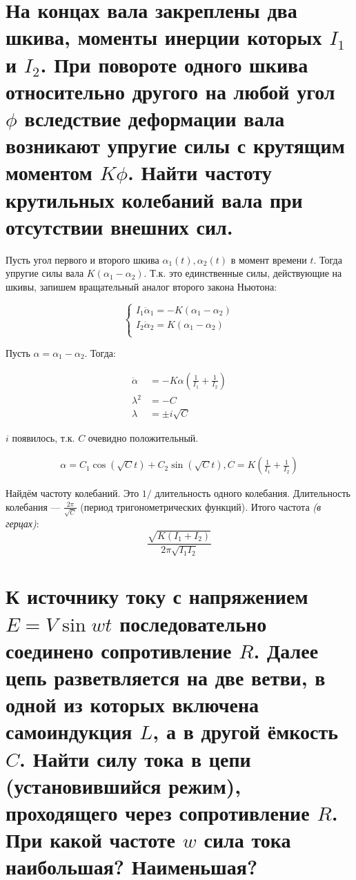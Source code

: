 \section{На концах вала закреплены два шкива, моменты инерции которых \(I_1\) и \(I_2\). При повороте одного шкива относительно другого на любой угол \(\phi\) вследствие деформации вала возникают упругие силы с крутящим моментом \(K\phi\). Найти частоту крутильных колебаний вала при отсутствии внешних сил.}

Пусть угол первого и второго шкива \(\alpha_1(t), \alpha_2(t)\) в момент времени \(t\). Тогда упругие силы вала \(K(\alpha_1 - \alpha_2)\). Т.к. это единственные силы, действующие на шкивы, запишем вращательный аналог второго закона Ньютона:

\[\begin{cases}
        I_1 \ddot \alpha_1 = -K(\alpha_1 - \alpha_2) \\
        I_2 \ddot \alpha_2 = K(\alpha_1 - \alpha_2)  \\
    \end{cases}\]

Пусть \(\alpha = \alpha_1 - \alpha_2\). Тогда:

\begin{align*}
    \ddot \alpha & = -K\alpha\left(\frac{1}{I_1} + \frac{1}{I_2}\right) \\
    \lambda^2    & = -C                                                 \\
    \lambda      & = \pm i \sqrt{C}
\end{align*}

\(i\) появилось, т.к. \(C\) очевидно положительный.

\begin{align*}
    \alpha = C_1\cos(\sqrt{C}t) + C_2\sin(\sqrt{C}t), C = K\left(\frac{1}{I_1} + \frac{1}{I_2}\right)
\end{align*}

Найдём частоту колебаний. Это \(1 /\) длительность одного колебания. Длительность колебания --- \(\frac{2\pi}{\sqrt{C}}\) (период тригонометрических функций). Итого частота \textit{(в герцах)}:
\[\frac{\sqrt{K(I_1 + I_2)}}{2\pi \sqrt{I_1I_2}}\]

\section{К источнику току с напряжением $E=V \sin wt$ последовательно соединено сопротивление $R$. Далее цепь разветвляется на две ветви, в одной из которых включена самоиндукция $L$,  а в другой ёмкость $C$. Найти силу тока в цепи (установившийся режим), проходящего через сопротивление $R$. При какой частоте $w$ сила тока наибольшая? Наименьшая?}

